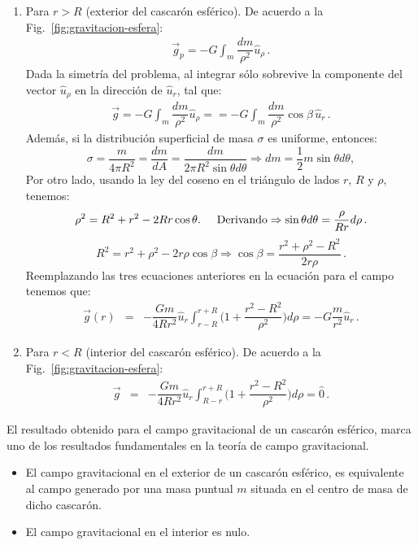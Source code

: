\begin{enumerate}
\item Para $r > R$ (exterior del cascarón esférico). De acuerdo a la Fig.~\ref{fig:gravitacion-esfera}:
\begin{eqnarray}
\vec{g}_p=-G\int_m \dfrac{dm}{\rho^2}\hat{u}_{\rho}\,.
\end{eqnarray}
Dada la simetría del problema, al integrar sólo sobrevive la componente del vector $\hat{u}_{\rho}$ en la dirección de $\hat{u}_r$, tal que:
\begin{eqnarray}
\vec{g}=-G\int_m \dfrac{dm}{\rho^2}\hat{u}_{\rho}==-G\int_m \dfrac{dm}{\rho^2} \cos\beta\, \hat{u}_r\,.
\end{eqnarray}
Además, si la distribución superficial de masa $\sigma$ es uniforme, entonces:
\begin{equation}
\sigma=\dfrac{m}{4\pi R^2}=\dfrac{dm}{dA}=\dfrac{dm}{2\pi R^2\sin\theta d\theta} \Rightarrow dm=\dfrac{1}{2}m\sin\theta d\theta ,
\end{equation}
Por otro lado, usando la ley del coseno en el triángulo de lados $r$, $R$ y $\rho$, tenemos:
%
\begin{equation}
\rho^2 =R^2 + r^2 -2Rr\cos\theta.  \hspace{0.5 cm} \text{Derivando} \Rightarrow \sin\theta d\theta = \dfrac{\rho}{Rr} d\rho\,.
\end{equation}
\begin{equation}
R^2=r^2+\rho^2 -2r\rho \cos\beta \Rightarrow \cos\beta =\dfrac{r^2+\rho^2 -R^2}{2r\rho}\,.
\end{equation}
%
Reemplazando las tres ecuaciones anteriores en la ecuación para el campo tenemos que:
\begin{eqnarray}
\vec{g}(r) &=& -\dfrac{Gm}{4Rr^2}\hat{u}_r \int_{r-R}^{r+R} \bigg(1+ \dfrac{r^2-R^2}{\rho^2}  \bigg)d\rho = -G \dfrac{m}{r^2}\hat{u}_r\,.
\label{ec:campo-gravitacional-cascaron}
\end{eqnarray}

\item Para $r < R$ (interior del cascarón esférico). De acuerdo a la Fig.~\ref{fig:gravitacion-esfera}:
\begin{eqnarray}
\vec{g} &=& -\dfrac{Gm}{4Rr^2}\hat{u}_r \int_{R-r}^{r+R} \bigg(1+ \dfrac{r^2-R^2}{\rho^2}  \bigg)d\rho = \hat{0}\,.
\end{eqnarray}
\end{enumerate}

El resultado obtenido para el campo gravitacional de un cascarón esférico, marca uno de los resultados fundamentales en la teoría de campo gravitacional. 
\begin{itemize}
\item El campo gravitacional en el exterior de un cascarón esférico, es equivalente al campo generado por una masa puntual $m$ situada en el centro de masa de dicho cascarón.
\item El campo gravitacional en el interior es nulo. 
\end{itemize}


